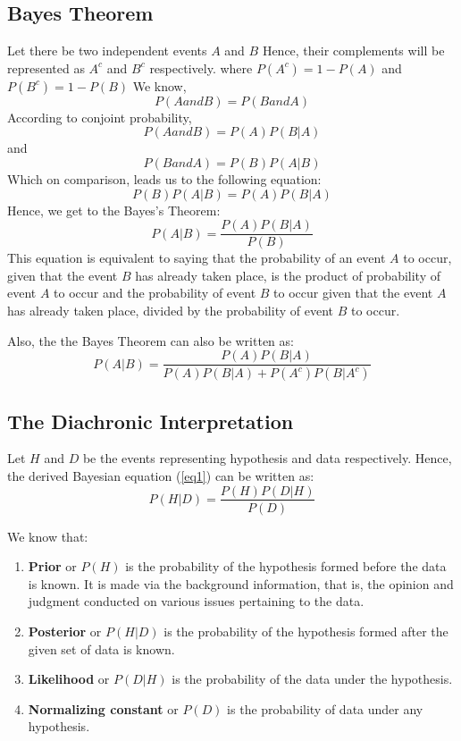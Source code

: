 \subsection{Bayes Theorem}
Let there be two independent events $A$ and $B$
Hence, their complements will be represented as $A^c$ and $B^c$ respectively.
where $P(A^c) = 1 - P(A)$ and $P(B^c) = 1 - P(B)$
We know,
$$P(A and B) = P(B and A)$$
According to conjoint probability,
$$P(A and B) = P(A)P(B|A)$$
and
$$P(B and A) = P(B)P(A|B)$$
Which on comparison, leads us to the following equation:
$$P(B)P(A|B) = P(A)P(B|A)$$
Hence, we get to the Bayes's Theorem:
\begin{equation} \label{eq1}
P(A|B) = \frac{P(A)P(B|A)}{P(B)}
\end{equation}
This equation is equivalent to saying that the probability of an event $A$ to occur, given that the event $B$ has already taken place, is the product of probability of event $A$ to occur and the probability of event $B$ to occur given that the event $A$ has already taken place, divided by the probability of event $B$ to occur.

Also, the the Bayes Theorem can also be written as:
\begin{equation} \label{eq2}
P(A|B) = \frac{P(A)P(B|A)}{P(A)P(B|A) + P(A^c)P(B|A^c)}
\end{equation}


\subsection{The Diachronic Interpretation}
Let $H$ and $D$ be the events representing hypothesis and data respectively.
Hence, the derived Bayesian equation (\ref{eq1}) can be written as:
\begin{equation} \label{eq3}
P(H|D) = \frac{P(H)P(D|H)}{P(D)}
\end{equation}

We know that:
\begin{enumerate}
\item \textbf{Prior} or $P(H)$ is the probability of the hypothesis formed before the data is known. It is made via the background information, that is, the opinion and judgment conducted on various issues pertaining to the data.
\item \textbf{Posterior} or $P(H|D)$ is the probability of the hypothesis formed after the given set of data is known.
\item \textbf{Likelihood} or $P(D|H)$ is the probability of the data under the hypothesis.
\item \textbf{Normalizing constant} or $P(D)$ is the probability of data under any hypothesis.
\end{enumerate}

